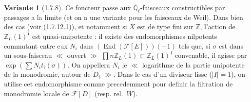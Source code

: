 \documentclass[12pt,a4paper]{article}
\theoremstyle{plain}
\theoremstyle{definition}
\newtheorem{var}[theorem]{Variante}
\theoremstyle{definition}
\theoremstyle{remark}
\DeclareMathOperator{\End}{End}
\begin{document}
\begin{var}[1.7.8]
Ce foncteur passe aux $\overline{\mathbb{Q}}_\ell$-faisceaux constructibles par passages a la limite (et on a une variante pour les faisceaux de Weil). Dans bien des cas (voir (1.7.12.1)), et notamment si $X$ est de type fini sur $\mathbb{Z}$, l'action de $\mathbb{Z}_L(1)^I$ est quasi-unipotente : il existe des endomorphismes nilpotents commutant entre eux $N_i$ dans $(\End(\mathscr{F}[E]))(-1)$ tels que, si $\sigma$ est dans un sous-faisceau $\ll$ ouvert $\gg$ $\prod n \mathbb{Z}_L(1) \subset \mathbb{Z}_L(1)^I$ convenable, il agisse par $\exp(\sum N_i t_i(\sigma))$. On appellera $N_i$ le $\ll$ logarithme de la partie unipotente de la monodromie, autour de $D_i$ $\gg$. Dans le cas d'un diviseur lisse ($|I| = 1$), on utilise cet endomorphisme comme precedemment pour definir la filtration de monodromie locale de $\mathscr{F}[D]$ (resp. rel.~$W$).
\end{var}
\end{document}
